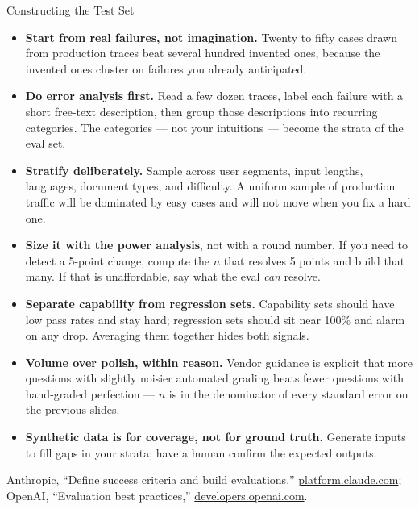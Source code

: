 \begin{frame}[allowframebreaks]{Constructing the Test Set}
  \begin{itemize}\footnotesize\itemsep0.3em
    \item[\textcolor{red}{$\blacktriangleright$}] \textbf{Start from real failures, not imagination.} Twenty to fifty cases drawn from production traces beat several hundred invented ones, because the invented ones cluster on failures you already anticipated.
    \item[\textcolor{red}{$\blacktriangleright$}] \textbf{Do error analysis first.} Read a few dozen traces, label each failure with a short free-text description, then group those descriptions into recurring categories. The categories --- not your intuitions --- become the strata of the eval set.
    \item[\textcolor{red}{$\blacktriangleright$}] \textbf{Stratify deliberately.} Sample across user segments, input lengths, languages, document types, and difficulty. A uniform sample of production traffic will be dominated by easy cases and will not move when you fix a hard one.
    \item[\textcolor{red}{$\blacktriangleright$}] \textbf{Size it with the power analysis}, not with a round number. If you need to detect a 5-point change, compute the $n$ that resolves 5 points and build that many. If that is unaffordable, say what the eval \textit{can} resolve.
    \item[\textcolor{red}{$\blacktriangleright$}] \textbf{Separate capability from regression sets.} Capability sets should have low pass rates and stay hard; regression sets should sit near 100\% and alarm on any drop. Averaging them together hides both signals.
    \item[\textcolor{red}{$\blacktriangleright$}] \textbf{Volume over polish, within reason.} Vendor guidance is explicit that more questions with slightly noisier automated grading beats fewer questions with hand-graded perfection --- $n$ is in the denominator of every standard error on the previous slides.
    \item[\textcolor{red}{$\blacktriangleright$}] \textbf{Synthetic data is for coverage, not for ground truth.} Generate inputs to fill gaps in your strata; have a human confirm the expected outputs.
  \end{itemize}
  \vspace{0.1em}
  {\scriptsize Anthropic, ``Define success criteria and build evaluations,'' \href{https://platform.claude.com/docs/en/test-and-evaluate/develop-tests}{platform.claude.com}; OpenAI, ``Evaluation best practices,'' \href{https://developers.openai.com/api/docs/guides/evaluation-best-practices}{developers.openai.com}.}
\end{frame}

